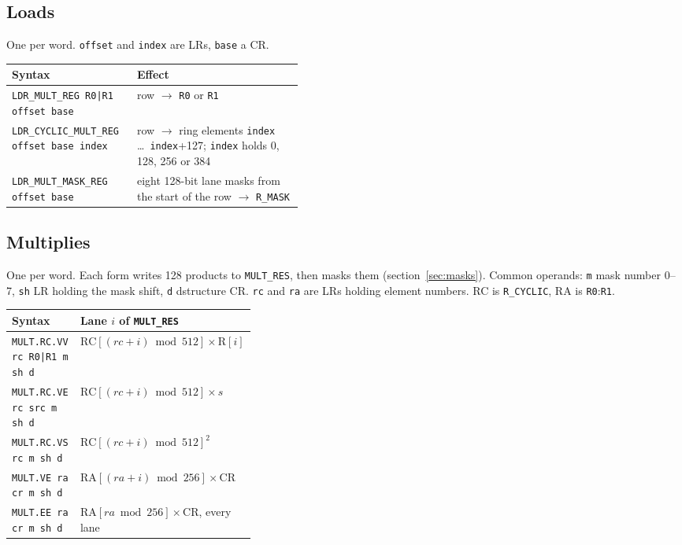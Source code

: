 \documentclass[11pt,a4paper]{article}
\begin{document}
\subsection{Loads}

One per word. \texttt{offset} and \texttt{index} are LRs, \texttt{base} a CR.

\begin{center}
\small
\begin{tabularx}{\linewidth}{>{\raggedright\arraybackslash}p{0.43\linewidth}>{\raggedright\arraybackslash}X}
\toprule
Syntax & Effect \\
\midrule
\texttt{LDR\_MULT\_REG R0|R1 offset base} & row $\rightarrow$ \texttt{R0} or
\texttt{R1} \\
\texttt{LDR\_CYCLIC\_MULT\_REG offset base index} & row $\rightarrow$ ring
elements \texttt{index} \ldots\ \texttt{index}+127; \texttt{index} holds 0, 128,
256 or 384 \\
\texttt{LDR\_MULT\_MASK\_REG offset base} & eight 128-bit lane masks from the
start of the row $\rightarrow$ \texttt{R\_MASK} \\
\bottomrule
\end{tabularx}
\end{center}

\subsection{Multiplies}

One per word. Each form writes 128 products to \texttt{MULT\_RES}, then masks
them (section~\ref{sec:masks}). Common operands: \texttt{m} mask number 0--7,
\texttt{sh} LR holding the mask shift, \texttt{d} dstructure CR. \texttt{rc}
and \texttt{ra} are LRs holding element numbers. RC is \texttt{R\_CYCLIC}, RA is
\texttt{R0}:\texttt{R1}.

\begin{center}
\small
\begin{tabularx}{\linewidth}{>{\raggedright\arraybackslash}p{0.36\linewidth}>{\raggedright\arraybackslash}X}
\toprule
Syntax & Lane $i$ of \texttt{MULT\_RES} \\
\midrule
\texttt{MULT.RC.VV rc R0|R1 m sh d} & $\mathrm{RC}[(rc+i) \bmod 512] \times
\mathrm{R}[i]$ \\
\texttt{MULT.RC.VE rc src m sh d} & $\mathrm{RC}[(rc+i) \bmod 512] \times s$ \\
\texttt{MULT.RC.VS rc m sh d} & $\mathrm{RC}[(rc+i) \bmod 512]^2$ \\
\texttt{MULT.VE ra cr m sh d} & $\mathrm{RA}[(ra+i) \bmod 256] \times
\mathrm{CR}$ \\
\texttt{MULT.EE ra cr m sh d} & $\mathrm{RA}[ra \bmod 256] \times \mathrm{CR}$,
every lane \\
\bottomrule
\end{tabularx}
\end{center}
\end{document}
